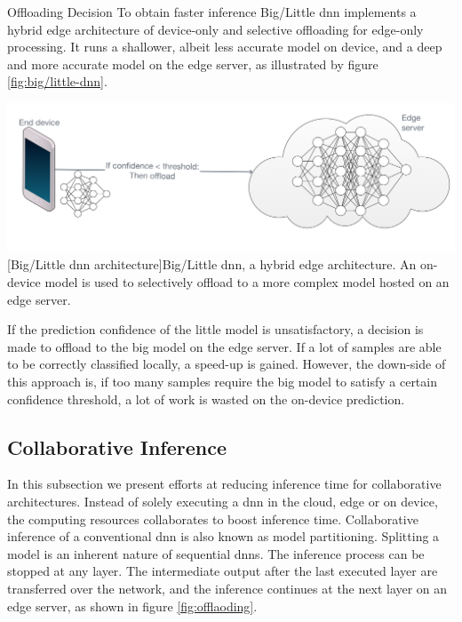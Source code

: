 \begin{enumdescript}
	\item[Offloading Decision] To obtain faster inference Big/Little \gls{dnn} \cite{park_big/little_2015} implements a hybrid edge architecture of device-only and selective offloading for edge-only processing. It runs a shallower, albeit less accurate model on device, and a deep and more accurate model on the edge server, as illustrated by figure \ref{fig:big/little-dnn}. 

\begin{minipage}[t]{\linewidth}                              
	\includegraphics[width=\linewidth]{figures/models/big_little_dnn}
	[Big/Little \gls{dnn} architecture]{Big/Little \gls{dnn}, a hybrid edge architecture. An on-device model is used to selectively offload to a more complex model hosted on an edge server.}
	\label{fig:big/little-dnn}
\end{minipage}

If the prediction confidence of the little model is unsatisfactory, a decision is made to offload to the big model on the edge server. If a lot of samples are able to be correctly classified locally, a speed-up is gained. However, the down-side of this approach is, if too many samples require the big model to satisfy a certain confidence threshold, a lot of work is wasted on the on-device prediction. 


\end{enumdescript}

\subsection{Collaborative Inference}

In this subsection we present efforts at reducing inference time for collaborative architectures. Instead of solely executing a \gls{dnn} in the cloud, edge or on device, the computing resources collaborates to boost inference time. Collaborative inference of a conventional \gls{dnn} is also known as model partitioning. Splitting a model is an inherent nature of sequential \gls{dnn}s. The inference process can be stopped at any layer. The intermediate output after the last executed layer are transferred over the network, and the inference continues at the next layer on an edge server, as shown in figure \ref{fig:offlaoding}.

